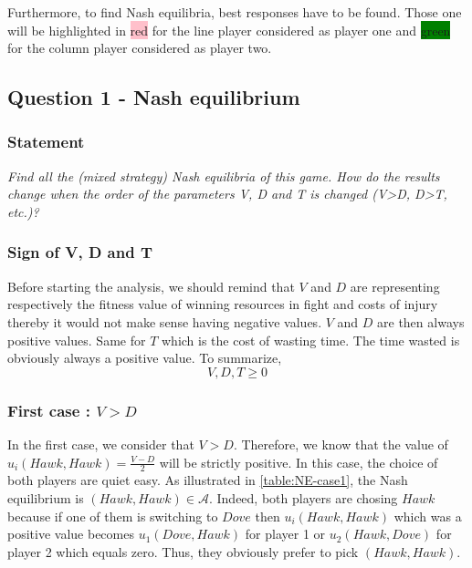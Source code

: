 \documentclass{article}
\begin{document}
Furthermore, to find Nash equilibria, best responses have to be found. Those one will be highlighted in \colorbox{pink}{red} for the line player considered as player one and \colorbox{green}{green} for the column player considered as player two. 

\subsection{Question 1 - Nash equilibrium}

\subsubsection*{Statement} 
\noindent
\textit{ Find all the (mixed strategy) Nash equilibria of this game. How do the results change when the order of the parameters V, D and T is changed (V>D, D>T, etc.)?}

\subsubsection*{Sign of V, D and T} 
Before starting the analysis, we should remind that $V$ and $D$ are representing respectively the fitness value of winning resources in fight and costs of injury thereby it would not make sense having negative values. $V$ and $D$ are then always positive values. Same for $T$ which is the cost of wasting time. The time wasted is obviously always a positive value. To summarize, 
$$ V, D, T \ge 0 $$  


\subsubsection{First case : $V>D$} 

In the first case, we consider that $V>D$. Therefore, we know that the value of $u_{i}(Hawk, Hawk) = \frac{V-D}{2}$ will be strictly positive. In this case, the choice of both players are quiet easy. As illustrated in \autoref{table:NE-case1}, the Nash equilibrium is $(Hawk, Hawk) \in \mathcal{A}$. Indeed, both players are chosing $Hawk$ because if one of them is switching to $Dove$ then $u_{i}(Hawk,Hawk)$ which was a positive value becomes $u_{1}(Dove,Hawk)$ for player 1 or $u_{2}(Hawk,Dove)$ for player 2 which equals zero. Thus, they obviously prefer to pick $(Hawk,Hawk)$. 
\end{document}
